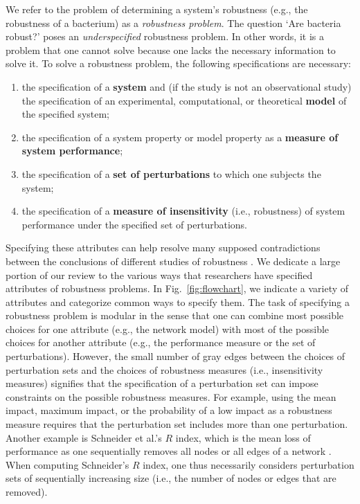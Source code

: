 \documentclass{comnet-mod}
\begin{document}
We refer to the problem of determining a system's robustness (e.g., the robustness of a bacterium) as a \textit{robustness problem}. The question `Are bacteria robust?' poses an \textit{underspecified} robustness problem. In other words, it is a problem that one cannot solve because one lacks the necessary information to solve it. To solve a robustness problem, the following specifications are necessary:
\begin{enumerate}
\item the specification of a {\bf system} and (if the study is not an observational study) the specification of an experimental, computational, or theoretical {\bf model} of the specified system;
\item the specification of a system property or model property as a {\bf measure of system performance};
\item the specification of a {\bf set of perturbations} to which one subjects the system;
\item the specification of a {\bf measure of insensitivity} (i.e., robustness) of system performance under the specified set of perturbations.
\end{enumerate}
Specifying these attributes can help resolve many supposed contradictions between the conclusions of different studies of robustness \cite{Alderson2010}. We dedicate a large portion of our review to the various ways that researchers have specified attributes of robustness problems.  In Fig.~\ref{fig:flowchart}, we indicate a variety of attributes and categorize common ways to specify them. The task of specifying a robustness problem is modular in the sense that one can combine most possible choices for one attribute (e.g., the network model) with most of the possible choices for another attribute (e.g., the performance measure or the set of perturbations). However, the small number of gray edges between the choices of perturbation sets and the choices of robustness measures (i.e., insensitivity measures) signifies that the specification of a perturbation set can impose constraints on the possible robustness measures. 
For example, using the mean impact, maximum impact, or the probability of a low impact as a robustness measure requires that the perturbation set includes more than one perturbation. Another example is Schneider et al.'s $R$ index, which is the mean loss of performance  as one sequentially removes all nodes or all edges of a network \cite{Schneider2011}. When computing Schneider's $R$ index, one thus necessarily considers perturbation sets  of sequentially increasing size (i.e., the number of nodes or edges that are removed).
\end{document}
